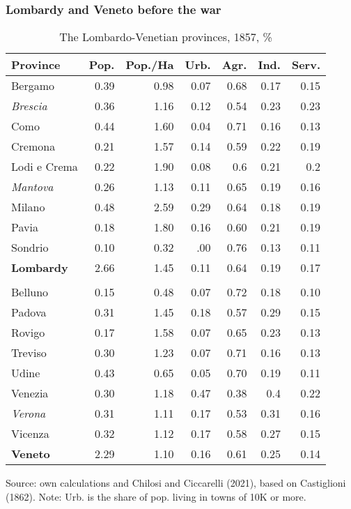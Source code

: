 \documentclass[10pt]{beamer}
\begin{document}
\begin{frame}
    \frametitle{Lombardy and Veneto before the war}

\begin{table}[!h]
\caption{The Lombardo-Venetian provinces, 1857, \%}
\centering
\fontsize{8}{8}\selectfont

    \begin{tabular}{l r r r r r r}  
        \toprule
        Province & Pop. & Pop./Ha & Urb. & Agr. & Ind. & Serv.    \\ 
        \midrule
        Bergamo & 0.39 & 0.98 & 0.07 & 0.68 & 0.17 & 0.15 \\
        \textit{Brescia} & 0.36 & 1.16 & 0.12 & 0.54 & 0.23 & 0.23 \\
        Como & 0.44 & 1.60 & 0.04 & 0.71 & 0.16 & 0.13 \\
        Cremona & 0.21 & 1.57 & 0.14 & 0.59 & 0.22 & 0.19 \\
        Lodi e Crema & 0.22 & 1.90 & 0.08 & 0.6 & 0.21 & 0.2 \\
        \textit{Mantova} & 0.26 & 1.13 & 0.11 & 0.65 & 0.19 & 0.16 \\
        Milano & 0.48 & 2.59 & 0.29 & 0.64 & 0.18 & 0.19 \\
        Pavia & 0.18 & 1.80 & 0.16 & 0.60 & 0.21 & 0.19 \\
        Sondrio & 0.10 & 0.32 & .00 & 0.76 & 0.13 & 0.11 \\
        \textbf{Lombardy} & 2.66 & 1.45 & 0.11 & 0.64 & 0.19 & 0.17 \\
         &  & &  &  &  \\
        Belluno & 0.15 & 0.48 & 0.07 & 0.72 & 0.18 & 0.10 \\
        Padova & 0.31 &1.45 & 0.18 & 0.57 & 0.29 & 0.15 \\
        Rovigo & 0.17 & 1.58 & 0.07 & 0.65 & 0.23 & 0.13 \\
        Treviso & 0.30 & 1.23 & 0.07 & 0.71 & 0.16 & 0.13 \\
        Udine & 0.43 & 0.65 & 0.05 & 0.70 & 0.19 & 0.11 \\
        Venezia & 0.30 & 1.18 & 0.47 & 0.38 & 0.4 & 0.22 \\
        \textit{Verona} & 0.31 & 1.11 & 0.17 & 0.53 & 0.31 & 0.16 \\
        Vicenza & 0.32 & 1.12 & 0.17 & 0.58 & 0.27 & 0.15 \\
        \textbf{Veneto} & 2.29 & 1.10 & 0.16 & 0.61 & 0.25 & 0.14 \\
        \bottomrule    
    \end{tabular}
    
    Source: own calculations and Chilosi and Ciccarelli (2021), based on Castiglioni (1862). Note: Urb. is the share of pop. living in towns of 10K or more.

\end{table}

   
\end{frame}
\end{document}
